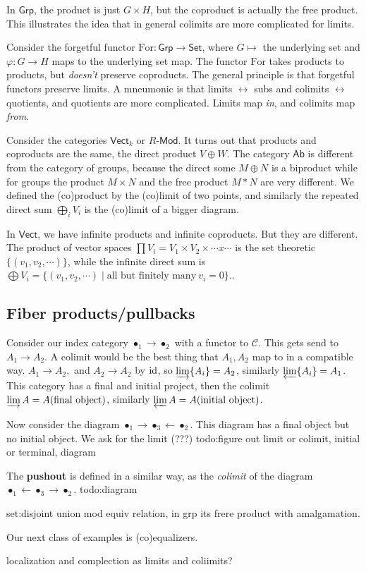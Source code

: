 \begin{example}
    In $\mathsf{Grp} $, the product is just $G \times H$, but the coproduct is actually the free product. This illustrates the idea that in general colimits are more complicated for limits.
\end{example}
Consider the forgetful functor $\mathrm{For}\colon \mathsf{Grp} \to \mathsf{Set} $, where $G\mapsto $ the underlying set and $\varphi \colon G \to H$ maps to the underlying set map. The functor $\mathrm{For}$ takes products to products, but \emph{doesn't} preserve coproducts. The general principle is that forgetful functors preserve limits. A mneumonic is that limits $\leftrightarrow$ subs and colimits  $\leftrightarrow$ quotients, and quotients are more complicated. Limits map \emph{in}, and colimits map \emph{from}.

\begin{example}
    Consider the categories $\mathsf{Vect} _k$ or $R$-$\mathsf{Mod}$. It turns out that products and coproducts are the same, the direct product $V \oplus W$. The category $\mathsf{Ab} $ is different from the category of groups, because the direct some $M\oplus N$ is a biproduct while for groups the product $M\times N$ and the free product $M * N$ are very different. We defined the (co)product by the (co)limit of two points, and similarly the repeated direct sum $\bigoplus _i V_i $ is the (co)limit of a bigger diagram.

    In $\mathsf{Vect} $, we have infinite products and infinite coproducts. But they are different. The product of vector spaces $\prod V_i =V_1 \times V_2 \times  \cdots  x \cdots $ is the set theoretic $\{(v_1,v_2, \cdots )\} $, while the infinite direct sum is $\bigoplus V_i = \{(v_1,v_2,\cdots ) \mid  \text{all but finitely many} \ v_i =0\} $..
\end{example}

\subsection{Fiber products/pullbacks}
Consider our index category $\bullet_1 \to \bullet_2$ with a functor to $\mathcal{C} $. This gets send to $A_1 \to A_2$. A colimit would be the best thing that $A_1,A_2$ map to in a compatible way. $A_1\to A_2,$ and $A_2 \to A_2$ by $\operatorname{id}$, so $\varinjlim\{A_i \} =A_2$, similarly $\varprojlim \{A_i \} =A_1$. This category has a final and initial project, then the colimit $\varinjlim A=A(\text{final object} )$, similarly $\varprojlim A= A( \text{initial object} )$.


Now consider the diagram $ \bullet_1 \rightarrow \bullet_3 \leftarrow \bullet_2$. This diagram has a final object but no initial object. We ask for the limit (???) {\color{red}todo:figure out limit or colimit, initial or terminal, diagram} 

The \textbf{pushout} is defined in a similar way, as the \emph{colimit} of the diagram $\bullet_1 \leftarrow \bullet_3 \rightarrow \bullet_2$. {\color{red}todo:diagram} 

set:disjoint union mod equiv relation, in grp its frere product with amalgamation.

Our next class of examples is (co)equalizers. 

localization and complection as limits and coliimits?
